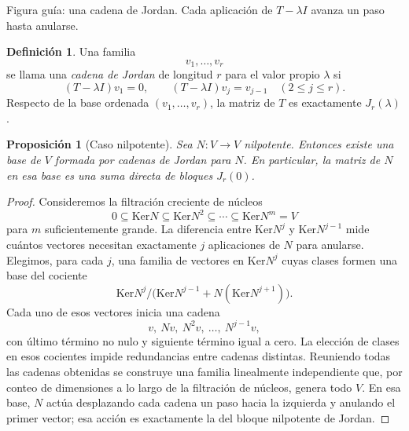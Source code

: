 \documentclass[10pt,a4paper,oneside]{article}
\theoremstyle{plain}
\newtheorem{proposition}[theorem]{Proposición}
\theoremstyle{definition}
\newtheorem{definition}[theorem]{Definición}
\theoremstyle{remark}
\newcommand{\Ker}{\mathrm{Ker}}
\begin{document}
\begin{center}

{\small Figura guía: una cadena de Jordan. Cada aplicación de \(T-\lambda I\) avanza un paso hasta anularse.}
\end{center}

\begin{definition}
Una familia
\[
v_1,\dots,v_r
\]
se llama una \emph{cadena de Jordan} de longitud \(r\) para el valor propio \(\lambda\) si
\[
(T-\lambda I)v_1=0,
\qquad
(T-\lambda I)v_j=v_{j-1}\quad (2\le j\le r).
\]
Respecto de la base ordenada \((v_1,\dots,v_r)\), la matriz de \(T\) es exactamente \(J_r(\lambda)\).
\end{definition}

\begin{proposition}[Caso nilpotente]
Sea \(N:V\to V\) nilpotente. Entonces existe una base de \(V\) formada por cadenas de Jordan para \(N\). En particular, la matriz de \(N\) en esa base es una suma directa de bloques \(J_r(0)\).
\end{proposition}

\begin{proof}
Consideremos la filtración creciente de núcleos
\[
0\subseteq \Ker N\subseteq \Ker N^2\subseteq\cdots\subseteq \Ker N^m=V
\]
para \(m\) suficientemente grande. La diferencia entre \(\Ker N^j\) y \(\Ker N^{j-1}\) mide cuántos vectores necesitan exactamente \(j\) aplicaciones de \(N\) para anularse. Elegimos, para cada \(j\), una familia de vectores en \(\Ker N^j\) cuyas clases formen una base del cociente
\[
\Ker N^j\Big/\bigl(\Ker N^{j-1}+N(\Ker N^{j+1})\bigr).
\]
Cada uno de esos vectores inicia una cadena
\[
v,\ Nv,\ N^2v,\ \dots,\ N^{j-1}v,
\]
con último término no nulo y siguiente término igual a cero. La elección de clases en esos cocientes impide redundancias entre cadenas distintas. Reuniendo todas las cadenas obtenidas se construye una familia linealmente independiente que, por conteo de dimensiones a lo largo de la filtración de núcleos, genera todo \(V\). En esa base, \(N\) actúa desplazando cada cadena un paso hacia la izquierda y anulando el primer vector; esa acción es exactamente la del bloque nilpotente de Jordan.
\end{proof}
\end{document}
